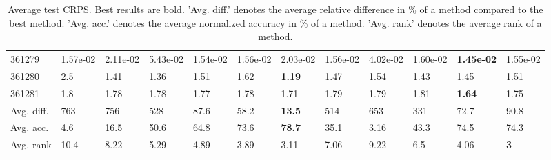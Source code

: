 \begin{table}[ht!]
\begin{tabular}{llllllllllll}
  361279 & 1.57e-02 & 2.11e-02 & 5.43e-02 & 1.54e-02 & 1.56e-02 & 2.03e-02 & 1.56e-02 & 4.02e-02 & 1.60e-02 & \textbf{1.45e-02} & 1.55e-02 \\ 
  361280 & 2.5 & 1.41 & 1.36 & 1.51 & 1.62 & \textbf{1.19} & 1.47 & 1.54 & 1.43 & 1.45 & 1.51 \\ 
  361281 & 1.8 & 1.78 & 1.78 & 1.77 & 1.78 & 1.71 & 1.79 & 1.79 & 1.81 & \textbf{1.64} & 1.75 \\ 
   \hline
Avg. diff. & 763 & 756 & 528 & 87.6 & 58.2 & \textbf{13.5} & 514 & 653 & 331 & 72.7 & 90.8 \\ 
  Avg. acc. & 4.6 & 16.5 & 50.6 & 64.8 & 73.6 & \textbf{78.7} & 35.1 & 3.16 & 43.3 & 74.5 & 74.3 \\ 
  Avg. rank & 10.4 & 8.22 & 5.29 & 4.89 & 3.89 & 3.11 & 7.06 & 9.22 & 6.5 & 4.06 & \textbf{3} \\ 
   \hline
\hline
\end{tabular}
\endgroup
\caption{Average test CRPS. 
                  Best results are bold. 
                  'Avg. diff.' denotes the average relative difference in \% of a method compared to the best method.
                  'Avg. acc.' denotes the average normalized accuracy in \% of a method.
                  'Avg. rank' denotes the average rank of a method.} 
\label{TABLES/table_results_CRPS_spatial_depth}
\end{table}
